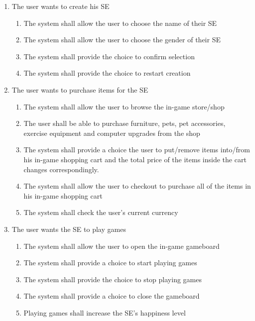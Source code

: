 \documentclass[]{article}
\begin{document}
\begin{enumerate}[start=1, label={\textbf{BE\arabic*.}}]
	\item The user wants to create his SE
    \begin{enumerate}[1.]
        \item The system shall allow the user to choose the name of their SE
        \item The system shall allow the user to choose the gender of their SE
        \item The system shall provide the choice to confirm selection
        \item The system shall provide the choice to restart creation
    \end{enumerate}
    
	\item The user wants to purchase items for the SE
	\begin{enumerate}[1.]
		\item The system shall allow the user to browse the in-game store/shop
        \item The user shall be able to purchase furniture, pets, pet 
        accessories, exercise equipment and computer upgrades from the shop
        \item The system shall provide a choice the user to put/remove items 
        into/from his in-game shopping cart and the total price of the items 
        inside the cart changes correspondingly.
        \item The system shall allow the user to checkout to purchase all of 
        the items in his in-game shopping cart
        \item The system shall check the user’s current currency
    \end{enumerate}
    
    \item The user wants the SE to play games
	\begin{enumerate}[1.]
		\item The system shall allow the user to open the in-game gameboard
        \item The system shall provide a choice to start playing games
        \item The system shall provide the choice to stop playing games
        \item The system shall provide a choice to close the gameboard
        \item Playing games shall increase the SE’s happiness level
    \end{enumerate}
    

\end{enumerate}
\end{document}
